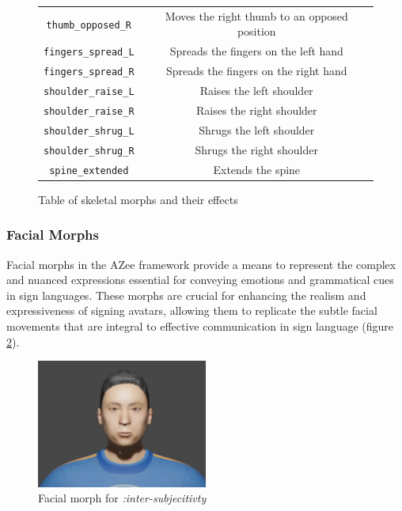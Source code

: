 \documentclass[../../main.tex]{subfiles}
\begin{document}
\begin{figure}
\begin{tabular}{|c|c|}
        \texttt{thumb\_opposed\_R} & Moves the right thumb to an opposed position \\
        \texttt{fingers\_spread\_L} & Spreads the fingers on the left hand \\
        \texttt{fingers\_spread\_R} & Spreads the fingers on the right hand \\
        \hline
        \texttt{shoulder\_raise\_L} & Raises the left shoulder \\
        \texttt{shoulder\_raise\_R} & Raises the right shoulder \\
        \texttt{shoulder\_shrug\_L} & Shrugs the left shoulder \\
        \texttt{shoulder\_shrug\_R} & Shrugs the right shoulder \\
        \texttt{spine\_extended} & Extends the spine \\
        \hline
    \end{tabular}
    \caption{Table of skeletal morphs and their effects}
    \label{fig:skeletal_morphs}
\end{figure}

\subsubsection{Facial Morphs}
\label{ch:rigging_layers:proc_rig_signing_avatars:morph_constraints:facial_morphs}

Facial morphs in the AZee framework provide a means to represent the complex and nuanced expressions essential for conveying emotions and grammatical cues in sign languages. These morphs are crucial for enhancing the realism and expressiveness of signing avatars, allowing them to replicate the subtle facial movements that are integral to effective communication in sign language (figure \ref{fig:facial_example}).

\begin{figure}
    \centering
    \includegraphics[width=0.5\textwidth]{chapters/rigging_layers/images/facial_example.png}
    \caption{Facial morph for \emph{:inter-subjecitivty}}
    \label{fig:facial_example}
\end{figure}
\end{document}
